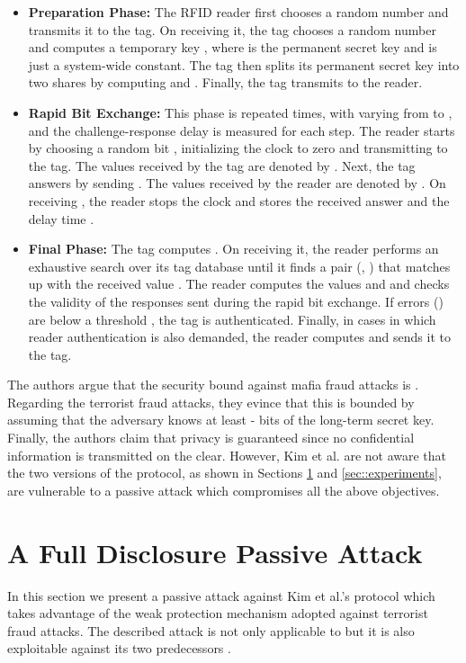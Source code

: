 \documentclass{article}
\begin{document}
\begin{itemize}
\item \textbf{Preparation Phase:} The RFID reader first chooses a random number  and transmits it to the tag. On receiving it, the tag chooses a random number  and computes a temporary key , where  is the permanent secret key and  is just a system-wide constant. The tag then splits its permanent secret key  into two shares by computing  and . Finally, the tag transmits  to the reader.

\item\textbf{ Rapid Bit Exchange:} This phase is repeated  times, with  varying from  to , and the challenge-response delay is measured for each step.  The reader starts by choosing a random bit , initializing the clock to zero and transmitting  to the tag. The values received by the tag are denoted by .  Next, the tag answers by sending . The values received by the reader are denoted by .  On receiving , the reader stops the clock and stores the received answer and the delay time .

\item \textbf{Final Phase:} The tag computes . On receiving it, the reader performs an exhaustive search over its tag database until it finds a pair (, ) that matches up with the received value . The reader computes the values  and  and checks the validity of the responses sent during the rapid bit exchange.  If errors () are below a threshold , the tag is authenticated. Finally, in cases in which reader authentication is also demanded, the reader computes  and sends it to the tag.
\end{itemize}


The authors argue that the security bound against mafia fraud attacks is . Regarding the terrorist fraud attacks, they evince that this is bounded by   assuming that the adversary knows at least - bits of the long-term secret key. Finally, the authors claim that privacy is guaranteed since no confidential information is transmitted on the clear. However, Kim et al. are not aware that the two versions of the protocol, as shown in Sections \ref{sec::secattack} and \ref{sec::experiments}, are vulnerable to a passive attack which compromises all the above objectives.


\section{A Full Disclosure Passive Attack} \label{sec::secattack}

In this section we present a passive attack against Kim et al.'s \cite{KimAKSP-2008-icisc} protocol which takes advantage of the weak protection mechanism adopted against terrorist fraud attacks. The described attack is not only applicable to \cite{KimAKSP-2008-icisc}  but it is also exploitable against its two predecessors \cite{TuP-2007-rfidtechnology,reid2007}.\\
\end{document}
